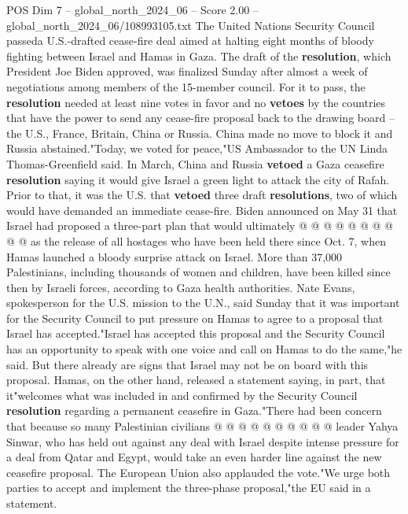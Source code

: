 \begin{textsample}{POS Dim 7 – global\_north\_2024\_06 – Score 2.00 – global\_north\_2024\_06/108993105.txt}  \label{ex:f7_pos_316}
The United Nations Security Council passeda U.S.-drafted cease-fire deal aimed at halting eight months of bloody fighting between Israel and Hamas in Gaza.
The draft of the \textbf{resolution}, which President Joe Biden approved, was finalized Sunday after almost a week of negotiations among members of the 15-member council.
For it to pass, the \textbf{resolution} needed at least nine votes in favor and no \textbf{vetoes} by the countries that have the power to send any cease-fire proposal back to the drawing board -- the U.S., France, Britain, China or Russia.
China made no move to block it and Russia abstained."Today, we voted for peace,"US Ambassador to the UN Linda Thomas-Greenfield said.
In March, China and Russia \textbf{vetoed} a Gaza ceasefire \textbf{resolution} saying it would give Israel a green light to attack the city of Rafah.
Prior to that, it was the U.S. that \textbf{vetoed} three draft \textbf{resolutions}, two of which would have demanded an immediate cease-fire.
Biden announced on May 31 that Israel had proposed a three-part plan that would ultimately @ @ @ @ @ @ @ @ @ @ as the release of all hostages who have been held there since Oct. 7, when Hamas launched a bloody surprise attack on Israel.
More than 37,000 Palestinians, including thousands of women and children, have been killed since then by Israeli forces, according to Gaza health authorities.
Nate Evans, spokesperson for the U.S. mission to the U.N., said Sunday that it was important for the Security Council to put pressure on Hamas to agree to a proposal that Israel has accepted."Israel has accepted this proposal and the Security Council has an opportunity to speak with one voice and call on Hamas to do the same,"he said.
But there already are signs that Israel may not be on board with this proposal.
Hamas, on the other hand, released a statement saying, in part, that it"welcomes what was included in and confirmed by the Security Council \textbf{resolution} regarding a permanent ceasefire in Gaza."There had been concern that because so many Palestinian civilians @ @ @ @ @ @ @ @ @ @ leader Yahya Sinwar, who has held out against any deal with Israel despite intense pressure for a deal from Qatar and Egypt, would take an even harder line against the new ceasefire proposal.
The European Union also applauded the vote."We urge both parties to accept and implement the three-phase proposal,"the EU said in a statement.

\end{textsample}
